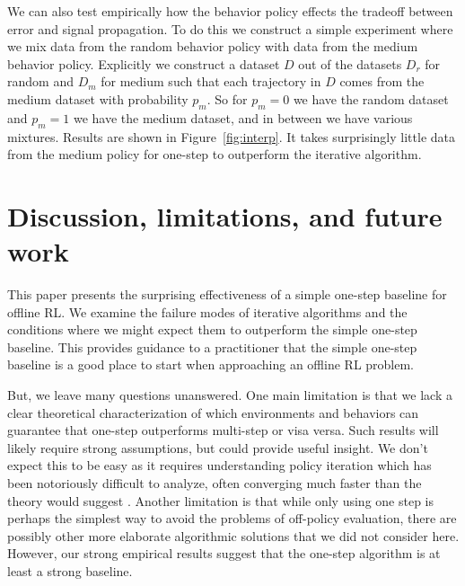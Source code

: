 We can also test empirically how the behavior policy effects the tradeoff between error and signal propagation. To do this we construct a simple experiment where we mix data from the random behavior policy with data from the medium behavior policy. Explicitly we construct a dataset $ D $ out of the datasets $ D_r$ for random and $ D_m$ for medium such that each trajectory in $ D $ comes from the medium dataset with probability $ p_m$. So for $ p_m = 0$ we have the random dataset and $ p_m = 1 $ we have the medium dataset, and in between we have various mixtures. Results are shown in Figure~\ref{fig:interp}. It takes surprisingly little data from the medium policy for one-step to outperform the iterative algorithm.



\section{Discussion, limitations, and future work}

This paper presents the surprising effectiveness of a simple one-step baseline for offline RL. We examine the failure modes of iterative algorithms and the conditions where we might expect them to outperform the simple one-step baseline. This provides guidance to a practitioner that the simple one-step baseline is a good place to start when approaching an offline RL problem.

But, we leave many questions unanswered.
One main limitation is that we lack a clear theoretical characterization of which environments and behaviors can guarantee that one-step outperforms multi-step or visa versa. Such results will likely require strong assumptions, but could provide useful insight. We don't expect this to be easy as it requires understanding policy iteration which has been notoriously difficult to analyze, often converging much faster than the theory would suggest \citep{sutton2018reinforcement, Agarwal2019ReinforcementLT}.
Another limitation is that while only using one step is perhaps the simplest way to avoid the problems of off-policy evaluation, there are possibly other more elaborate algorithmic solutions that we did not consider here. However, our strong empirical results suggest that the one-step algorithm is at least a strong baseline.









